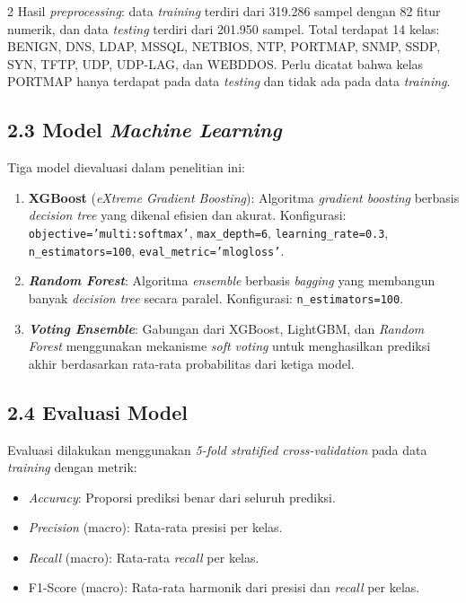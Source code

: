 \documentclass[10pt,a4paper]{article}
\begin{document}
\begin{multicols}{2}
Hasil \textit{preprocessing}: data \textit{training} terdiri dari 319.286 sampel dengan 82 fitur numerik, dan data \textit{testing} terdiri dari 201.950 sampel. Total terdapat 14 kelas: BENIGN, DNS, LDAP, MSSQL, NETBIOS, NTP, PORTMAP, SNMP, SSDP, SYN, TFTP, UDP, UDP-LAG, dan WEBDDOS. Perlu dicatat bahwa kelas PORTMAP hanya terdapat pada data \textit{testing} dan tidak ada pada data \textit{training}.

\subsection*{2.3 Model \textit{Machine Learning}}

Tiga model dievaluasi dalam penelitian ini:

\begin{enumerate}
\item \textbf{XGBoost} (\textit{eXtreme Gradient Boosting}): Algoritma \textit{gradient boosting} berbasis \textit{decision tree} yang dikenal efisien dan akurat. Konfigurasi: \texttt{objective='multi:softmax'}, \texttt{max\_depth=6}, \texttt{learning\_rate=0.3}, \texttt{n\_estimators=100}, \texttt{eval\_metric='mlogloss'}.
\item \textbf{\textit{Random Forest}}: Algoritma \textit{ensemble} berbasis \textit{bagging} yang membangun banyak \textit{decision tree} secara paralel. Konfigurasi: \texttt{n\_estimators=100}.
\item \textbf{\textit{Voting Ensemble}}: Gabungan dari XGBoost, LightGBM, dan \textit{Random Forest} menggunakan mekanisme \textit{soft voting} untuk menghasilkan prediksi akhir berdasarkan rata-rata probabilitas dari ketiga model.
\end{enumerate}

\subsection*{2.4 Evaluasi Model}

Evaluasi dilakukan menggunakan \textit{5-fold stratified cross-validation} pada data \textit{training} dengan metrik:
\begin{itemize}
\item \textit{Accuracy}: Proporsi prediksi benar dari seluruh prediksi.
\item \textit{Precision} (macro): Rata-rata presisi per kelas.
\item \textit{Recall} (macro): Rata-rata \textit{recall} per kelas.
\item F1-Score (macro): Rata-rata harmonik dari presisi dan \textit{recall} per kelas.
\end{itemize}


\end{multicols}
\end{document}
